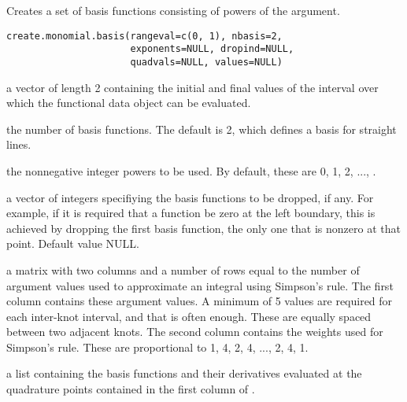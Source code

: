 \begin{Description}\relax
Creates a set of basis functions consisting of powers
of the argument.
\end{Description}
\begin{Usage}
\begin{verbatim}
create.monomial.basis(rangeval=c(0, 1), nbasis=2,
                      exponents=NULL, dropind=NULL,
                      quadvals=NULL, values=NULL)
\end{verbatim}
\end{Usage}
\begin{Arguments}
\begin{ldescription}
\item[\code{rangeval}] a vector of length 2 containing the initial and final
values of the interval over which the functional
data object can be evaluated.

\item[\code{nbasis}] the number of basis functions. The default is 2,
which defines a basis for straight lines.

\item[\code{exponents}] the nonnegative integer powers to be used.  By default,
these are 0, 1, 2, ..., .

\item[\code{dropind}] a vector of integers specifiying the basis functions to
be dropped, if any.  For example, if it is required that
a function be zero at the left boundary, this is achieved
by dropping the first basis function, the only one that
is nonzero at that point. Default value NULL.

\item[\code{quadvals}] a matrix with two columns and a number of rows equal to the number of
argument values used to approximate an integral using Simpson's rule.
The first column contains these argument values.
A minimum of 5 values are required for
each inter-knot interval, and that is often enough. These
are equally spaced between two adjacent knots.
The second column contains the weights used for Simpson's
rule.  These are proportional to 1, 4, 2, 4, ..., 2, 4, 1.

\item[\code{values}] a list containing the basis functions and their derivatives
evaluated at the quadrature points contained in the first
column of .

\end{ldescription}
\end{Arguments}
